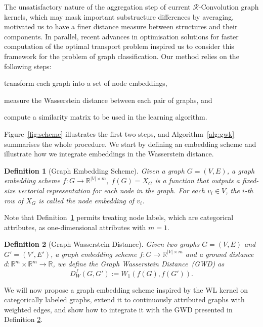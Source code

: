\documentclass{article}
\newtheorem{definition}{Definition}
\begin{document}
The unsatisfactory nature of the aggregation step of current \mbox{$\mathcal{R}$-Convolution} graph kernels, which may mask important substructure differences by averaging, motivated us to have a finer distance measure between structures and their components. 
In parallel, recent advances in optimisation solutions for faster computation of the optimal transport problem inspired us to consider this framework for the problem of graph classification.
Our method relies on the following steps:
\begin{inparaenum}[(1)]
 \item transform each graph into a set of node embeddings,
 \item measure the Wasserstein distance between each pair of graphs, and
 \item compute a similarity matrix to be used in the learning algorithm.
\end{inparaenum}
Figure~\ref{fig:scheme} illustrates the first two steps, and 
Algorithm~\ref{alg:gwk} summarises the whole procedure. We start by defining an embedding scheme and illustrate how we integrate embeddings in the Wasserstein distance.

\begin{definition}[Graph Embedding Scheme]
\label{def:embed_scheme}
Given a graph $G=(V,E)$, a graph embedding scheme $f\colon \mathit{G} \to \mathbb{R}^{|V| \times m},\; f(G) = X_G$ is a function that outputs a fixed-size vectorial representation for each node in the graph. For each $v_i\in V$, the $i$-th row of $X_G$ is called the node embedding of $v_i$.
\end{definition}

Note that Definition~\ref{def:embed_scheme} permits treating node labels, which are categorical attributes, as one-dimensional attributes with $m=1$.

\begin{definition}[Graph Wasserstein Distance]
\label{def:graph_wass}
Given two graphs $G=(V,E)$ and $G'=(V',E')$, a graph embedding scheme $f\colon \mathit{G} \rightarrow \mathbb{R}^{|V| \times m} $ and a ground distance $d\colon \mathbb{R}^{m}\times \mathbb{R}^{m} \rightarrow \mathbb{R}$, we define the Graph Wasserstein Distance~(GWD) as
\begin{equation}
\label{eq:graph_wass}
D^f_{W}(G,G') := W_1(f(G),f(G')).
\end{equation}
\end{definition}


We will now propose a graph embedding scheme inspired by the WL kernel on categorically labeled graphs, extend it to continuously attributed graphs with weighted edges, and show how to integrate it with the GWD presented in Definition \ref{def:graph_wass}. 
\end{document}
